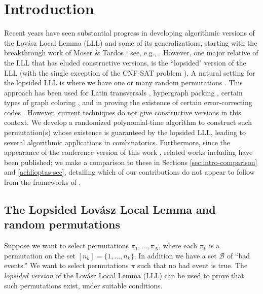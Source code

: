\tocarxivcategory{!!!}

\fi %






\section{Introduction}
Recent years have seen substantial progress in developing algorithmic versions of the Lov\'{a}sz Local Lemma (LLL) and some of its generalizations, starting with the breakthrough work of Moser \& Tardos \cite{moser-tardos}: see, e.g., \cite{haeupler,harris-srin2,DBLP:conf/stoc/KolipakaS11,pegden}. However, one major relative of the LLL that has eluded constructive versions, is the ``lopsided" version of the LLL (with the single exception of the CNF-SAT problem \cite{moser-tardos}).
 A natural setting for the lopsided LLL is where we have one or many random permutations \cite{erdos-spencer,lu,mohr}.  This approach has been used for Latin transversals \cite{bissacot,erdos-spencer,szabo:transversals}, hypergraph packing \cite{random-inj}, certain types of graph coloring \cite{bottcher}, and in proving the existence of certain error-correcting codes \cite{keevash}. However, current techniques do not give constructive versions in this context. We develop a randomized polynomial-time algorithm to construct such permutation(s) whose existence is guaranteed by the lopsided LLL, leading to several algorithmic applications in combinatorics. Furthermore, since the appearance of the
conference version of this work \cite{harris-srin-lllperm}, related works including \cite{achlioptas,harvey,kolmogorov} have been published; we make a comparison to these in 
Sections \ref{sec:intro-comparison} and \ref{achlioptas-sec}, detailing which of our contributions do not appear to follow from the frameworks of
\cite{achlioptas,harvey,kolmogorov}. 

\subsection{The Lopsided Lov\'{a}sz Local Lemma and random permutations}
\label{sec:perm-lll}
Suppose we want to select permutations $\pi_1, \dots, \pi_N$, where each $\pi_k$ is a permutation on the set $[n_k] = \{1, \dots, n_k\}$. In addition we have a set $\mathcal B$ of ``bad events.'' We want to select permutations $\pi$ such that no bad event is true. The \emph{lopsided version} of the Lov\'{a}sz Local Lemma (LLL) can be used to prove that such permutations exist, under suitable conditions.

